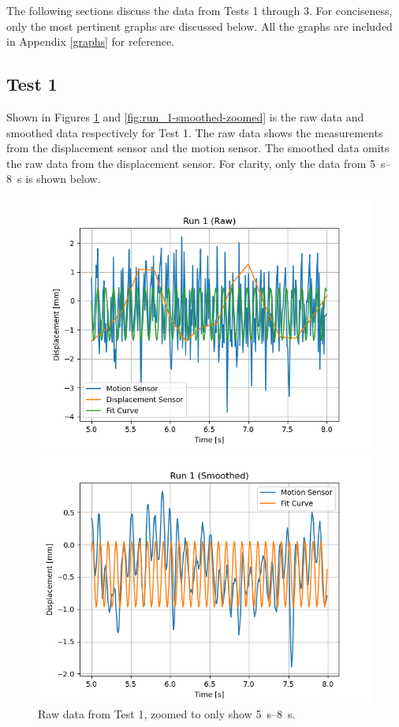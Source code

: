 \documentclass[12 pt]{report}
\begin{document}
The following sections discuss the data from Tests 1 through 3. For conciseness, only the most pertinent graphs are discussed below. All the graphs are included in Appendix \ref{graphs} for reference.

\subsection{Test 1} \label{data-test_1}
Shown in Figures \ref{fig:run_1-raw-zoomed} and \ref{fig:run_1-smoothed-zoomed} is the raw data and smoothed data respectively for Test 1. The raw data shows the measurements from the displacement sensor and the motion sensor. The smoothed data omits the raw data from the displacement sensor. For clarity, only the data from \qtyrange{5}{8}{\s} is shown below.

\begin{figure}[htbp]
    \centering
    \begin{minipage}{0.45\textwidth}
        \centering
        \includegraphics[width=1.0\textwidth]{images/Graphs/Run_1-Raw-Zoomed} %
        \caption{Raw data from Test 1, zoomed to only show \qtyrange{5}{8}{\s}.}
        \label{fig:run_1-raw-zoomed}
    \end{minipage}\hfill
    \begin{minipage}{0.45\textwidth}
        \centering
        \includegraphics[width=1.0\textwidth]{images/Graphs/Run_1-Smoothed-Zoomed} %

\end{minipage}
\end{figure}
\end{document}
